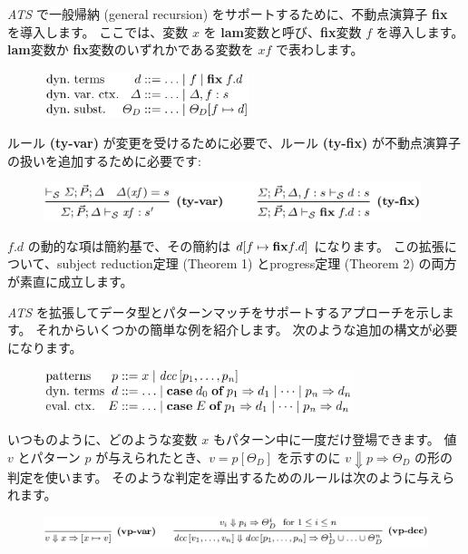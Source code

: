 \documentclass[submit,techreq,noauthor,onecolumn]{ipsj}
\begin{document}
{\it ATS} で一般帰納 (general recursion) をサポートするために、不動点演算子 {\bf fix} を導入します。
ここでは、変数 $x$ を {\bf lam}変数と呼び、{\bf fix}変数 $f$ を導入します。
 {\bf lam}変数か {\bf fix}変数のいずれかである変数を $xf$ で表わします。

\begin{figure}[h]
\centering
\includegraphics[width=6cm]{img/infig3_general_recursion.png}
\end{figure}

ルール {\bf (ty-var)} が変更を受けるために必要で、ルール {\bf (ty-fix)} が不動点演算子の扱いを追加するために必要です:

\begin{figure}[h]
\centering
\includegraphics[width=11cm]{img/infig3_fixed-point_op.png}
\end{figure}

 $f.d$ の動的な項は簡約基で、その簡約は $d[f \mapsto {\bf fix} f.d]$ になります。
この拡張について、subject reduction定理 (Theorem 1) とprogress定理 (Theorem 2) の両方が素直に成立します。

{\it ATS} を拡張してデータ型とパターンマッチをサポートするアプローチを示します。
それからいくつかの簡単な例を紹介します。
次のような追加の構文が必要になります。

\begin{figure}[h]
\centering
\includegraphics[width=9cm]{img/infig3_pattern_match.png}
\end{figure}

\noindent いつものように、どのような変数 $x$ もパターン中に一度だけ登場できます。
値 $v$ とパターン $p$ が与えられたとき、$v = p[\Theta_D]$ を示すのに $v \Downarrow p \Rightarrow \Theta_D$ の形の判定を使います。
そのような判定を導出するためのルールは次のように与えられます。

\begin{figure}[h]
\centering
\includegraphics[width=14cm]{img/infig3_vp-doc.png}
\end{figure}
\end{document}
